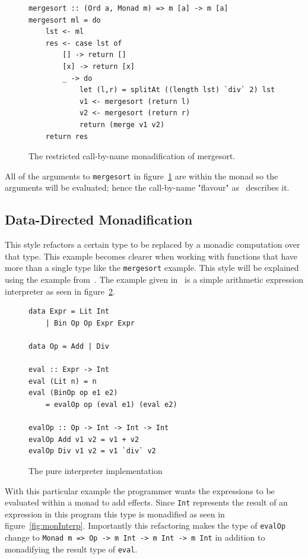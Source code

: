 \begin{figure}[t]
\begin{lstlisting}
mergesort :: (Ord a, Monad m) => m [a] -> m [a]
mergesort ml = do
	lst <- ml
	res <- case lst of
		[] -> return []
		[x] -> return [x]
		_ -> do 
			let (l,r) = splitAt ((length lst) `div` 2) lst
			v1 <- mergesort (return l)
			v2 <- mergesort (return r)
			return (merge v1 v2)
	return res	
\end{lstlisting}
\caption{The restricted call-by-name monadification of mergesort.}
\label{resCBN}
\end{figure}

All of the arguments to \texttt{mergesort} in figure~\ref{resCBN} are within the monad so the arguments will be evaluated; hence the call-by-name "flavour" as~\citep{monadSurvey} describes it.

\subsection{Data-Directed Monadification}
This style refactors a certain type to be replaced by a monadic computation over that type. This example becomes clearer when working with functions that have more than a single type like the \texttt{mergesort} example. This style will be explained using the example from~\citep{monadSurvey}. The example given in~\citep{monadSurvey} is a simple arithmetic expression interpreter as seen in figure~\ref{fig:interpreter}.

\begin{figure}[t]
\begin{lstlisting}
data Expr = Lit Int
	| Bin Op Op Expr Expr

data Op = Add | Div

eval :: Expr -> Int
eval (Lit n) = n
eval (BinOp op e1 e2)
	= evalOp op (eval e1) (eval e2)
	
evalOp :: Op -> Int -> Int -> Int
evalOp Add v1 v2 = v1 + v2
evalOp Div v1 v2 = v1 `div` v2
\end{lstlisting}
\caption{The pure interpreter implementation}
\label{fig:interpreter}
\end{figure}

With this particular example the programmer wants the expressions to be evaluated within a monad to add effects. Since \texttt{Int} represents the result of an expression in this program this type is monadified as seen in figure~\ref{fig:monInterp}. Importantly this refactoring makes the type of \texttt{evalOp} change to \texttt{Monad m => Op -> m Int -> m Int -> m Int} in addition to monadifying the result type of \texttt{eval}. 

